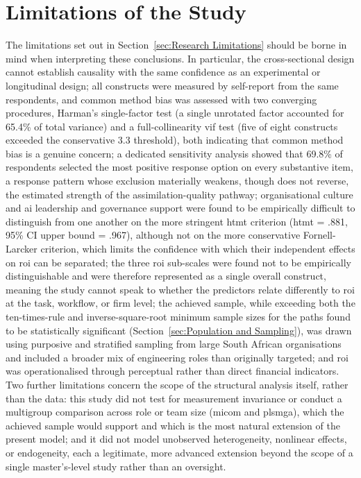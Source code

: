 \section{Limitations of the Study}
\label{sec:Ch6 Limitations}
The limitations set out in Section~\ref{sec:Research Limitations} should be borne in mind when interpreting these conclusions. In particular, the cross-sectional design cannot establish causality with the same confidence as an experimental or longitudinal design; all constructs were measured by self-report from the same respondents, and common method bias was assessed with two converging procedures, Harman's single-factor test (a single unrotated factor accounted for 65.4\% of total variance) and a full-collinearity \gls{vif} test (five of eight constructs exceeded the conservative 3.3 threshold), both indicating that common method bias is a genuine concern; a dedicated sensitivity analysis showed that 69.8\% of respondents selected the most positive response option on every substantive item, a response pattern whose exclusion materially weakens, though does not reverse, the estimated strength of the assimilation-quality pathway; organisational culture and \gls{ai} leadership and governance support were found to be empirically difficult to distinguish from one another on the more stringent \gls{htmt} criterion (\gls{htmt} = .881, 95\% CI upper bound = .967), although not on the more conservative Fornell-Larcker criterion, which limits the confidence with which their independent effects on \gls{roi} can be separated; the three \gls{roi} sub-scales were found not to be empirically distinguishable and were therefore represented as a single overall construct, meaning the study cannot speak to whether the predictors relate differently to \gls{roi} at the task, workflow, or firm level; the achieved sample, while exceeding both the ten-times-rule and inverse-square-root minimum sample sizes for the paths found to be statistically significant (Section~\ref{sec:Population and Sampling}), was drawn using purposive and stratified sampling from large South African organisations and included a broader mix of engineering roles than originally targeted; and \gls{roi} was operationalised through perceptual rather than direct financial indicators. Two further limitations concern the scope of the structural analysis itself, rather than the data: this study did not test for measurement invariance or conduct a multigroup comparison across role or team size (\gls{micom} and \gls{plsmga}), which the achieved sample would support and which is the most natural extension of the present model; and it did not model unobserved heterogeneity, nonlinear effects, or endogeneity, each a legitimate, more advanced extension beyond the scope of a single master's-level study rather than an oversight.


